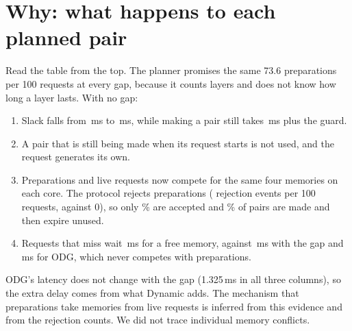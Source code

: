 \documentclass[11pt,a4paper]{report}
\newcommand{\ms}{\,ms}
\newcommand{\fit}[1]{\resizebox{\linewidth}{!}{}}
\begin{document}
\section{Why: what happens to each planned pair}
\begin{table}[htbp]\centering\fit{generated/funnel.tex}\caption{QFT, $M=4$, $C=3$, efficiency 0.95, four seeds: what happens to the planned preparations, and what a request pays, at three gaps.}\label{tab:funnel}\end{table}
Read the table from the top. The planner promises the same 73.6 preparations per 100 requests at every gap, because it counts layers and does not know how long a layer lasts. With no gap:
\begin{enumerate}
\item Slack falls from \FunnelSlackFive{}\ms{} to \FunnelSlackZero{}\ms{}, while making a pair still takes \FunnelPrep{}\ms{} plus the guard.
\item A pair that is still being made when its request starts is not used, and the request generates its own.
\item Preparations and live requests now compete for the same four memories on each core. The protocol rejects preparations (\FunnelRejectZero{} rejection events per 100 requests, against 0), so only \FunnelAcceptedZero{}\% are accepted and \FunnelExpiredZero{}\% of pairs are made and then expire unused.
\item Requests that miss wait \FunnelMissWaitZero{}\ms{} for a free memory, against \FunnelMissWaitFive{}\ms{} with the gap and \FunnelOdgWait{}\ms{} for ODG, which never competes with preparations.
\end{enumerate}
ODG's latency does not change with the gap (1.325\ms{} in all three columns), so the extra delay comes from what Dynamic adds. The mechanism that preparations take memories from live requests is inferred from this evidence and from the rejection counts. We did not trace individual memory conflicts.
\end{document}
